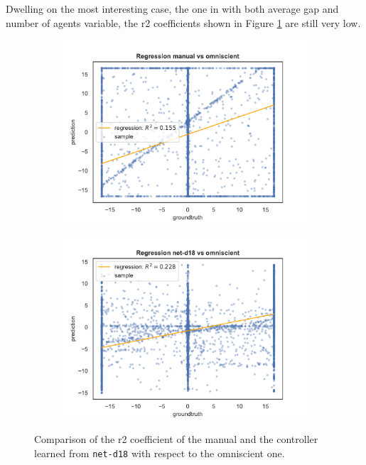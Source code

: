 Dwelling on the most interesting case, the one in with both average gap and 
number of agents variable, the \gls{r2} coefficients shown in Figure 
\ref{fig:net-d18r2} are still very low.
\begin{figure}[!htb]
	\centering
	\begin{subfigure}[h]{0.49\textwidth}
		\centering
		\includegraphics[width=\textwidth]{contents/images/net-d18/regression-manualvsomniscient}%
	\end{subfigure}
	\hfill
	\begin{subfigure}[h]{0.49\textwidth}
		\centering
		\includegraphics[width=\textwidth]{contents/images/net-d18/regression-net-d18-vs-omniscient}
	\end{subfigure}
	\caption[Evaluation of the \gls{r2} coefficients of \texttt{net-d18} 
	.]{Comparison of the \gls{r2} coefficient of the manual and the controller 
	learned from \texttt{net-d18} with respect to the omniscient one.}
	\label{fig:net-d18r2}
\end{figure}

